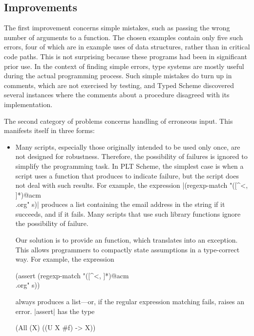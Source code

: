 \begin{schemeregion}
\subsection{Improvements}

The first improvement concerns simple mistakes, such as passing the
wrong number of arguments to a function. The chosen examples contain
only five such errors, four of which are in example uses of data
structures, rather than in critical code paths. This is not
surprising because these programs had been in significant prior use.
In the context of finding simple errors, type systems are mostly
useful during the actual programming process.  Such simple mistakes do
turn up in comments, which are not exercised by testing, and Typed
Scheme discovered several instances where the comments about a
procedure disagreed with its implementation.

The second category of problems concerns
handling of erroneous input.  This manifests itself in three forms:

\begin{itemize}
  \item Many scripts, especially those originally intended to be used
    only once, are not designed for robustness.  Therefore, the
    possibility of failures is ignored to simplify the programming
    task. In PLT Scheme, the simplest case is when a script uses a
    function that produces  to indicate failure, but the script
    does not deal with such results.  For example, the
    expression
    \scheme|(regexp-match "([^<, ]*)@acm\\.org" s)| produces a list
    containing the email address in the string  if it
    succeeds, and  if it fails.  Many scripts that use such
    library functions ignore the possibility of failure.

    Our solution is to provide an  function, which
    translates  into an exception.  This allows programmers
    to compactly state assumptions in a
    type-correct way.  For example, the expression 

\begin{schemedisplay}
(assert (regexp-match "([^<, ]*)@acm\\.org" s))
\end{schemedisplay}

    always
    produces a list---or, if the regular expression matching fails,
    raises an error.  \scheme|assert| has the type
\begin{schemedisplay}
(All (X) ((U X #f) -> X))
\end{schemedisplay}
    

\end{itemize}
\end{schemeregion}
